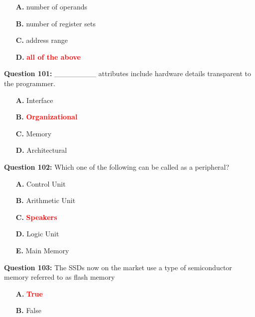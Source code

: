 \documentclass[12pt,a4paper]{article}
\begin{document}
\begin{itemize}
    \item[\textbf{A.}] number of operands
    \item[\textbf{B.}] number of register sets
    \item[\textbf{C.}] address range
    \item[\textbf{D.}] \textcolor{red}{\textbf{all of the above}}
\end{itemize}

\vspace{0.5cm}

\textbf{Question 101:} ________ attributes include hardware details transparent to the programmer.

\begin{itemize}
    \item[\textbf{A.}] Interface
    \item[\textbf{B.}] \textcolor{red}{\textbf{Organizational}}
    \item[\textbf{C.}] Memory
    \item[\textbf{D.}] Architectural
\end{itemize}

\vspace{0.5cm}

\textbf{Question 102:} Which one of the following can be called as a peripheral?

\begin{itemize}
    \item[\textbf{A.}] Control Unit
    \item[\textbf{B.}] Arithmetic Unit
    \item[\textbf{C.}] \textcolor{red}{\textbf{Speakers}}
    \item[\textbf{D.}] Logic Unit
    \item[\textbf{E.}] Main Memory
\end{itemize}

\vspace{0.5cm}

\textbf{Question 103:} The SSDs now on the market use a type of semiconductor memory referred to as flash memory

\begin{itemize}
    \item[\textbf{A.}] \textcolor{red}{\textbf{True}}
    \item[\textbf{B.}] False
\end{itemize}

\vspace{0.5cm}
\end{document}
